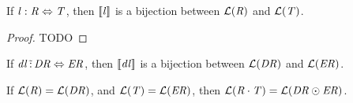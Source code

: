 \documentclass[numbers,10pt,preprint\ifanon ,nocopyrightspace\fi]{sigplanconf}
\begin{document}
\begin{lemma}
  \label{lem:lens-bij}
  If $\mathit{l} : \mathit{R} \Leftrightarrow \mathit{T}$, then
  $[ \! [\mathit{l}] \! ]$ is a bijection between $\mathcal{L}(\mathit{R})$ and
  $\mathcal{L}(\mathit{T})$.
\end{lemma}
\begin{proof}
  TODO
\end{proof}

\begin{lemma}
  \label{lem:rw-dnf-lens-bij}
  If $\mathit{dl} \,\tilde{:}\, \mathit{DR} \Leftrightarrow \mathit{ER}$, then
  $[ \! [\mathit{dl}] \! ]$ is a bijection between $\mathcal{L}(\mathit{DR})$ and
  $\mathcal{L}(\mathit{ER})$.
\end{lemma}

\begin{lemma}
  \label{lem:cdnfeq}
  If $\mathcal{L}(\mathit{R})=\mathcal{L}(\mathit{DR})$,
  and $\mathcal{L}(\mathit{T})=\mathcal{L}(\mathit{ER})$,
  then $\mathcal{L}(\mathit{R}\cdot\mathit{T})=
  \mathcal{L}(\mathit{DR}\odot\mathit{ER})$.
\end{lemma}
\end{document}
